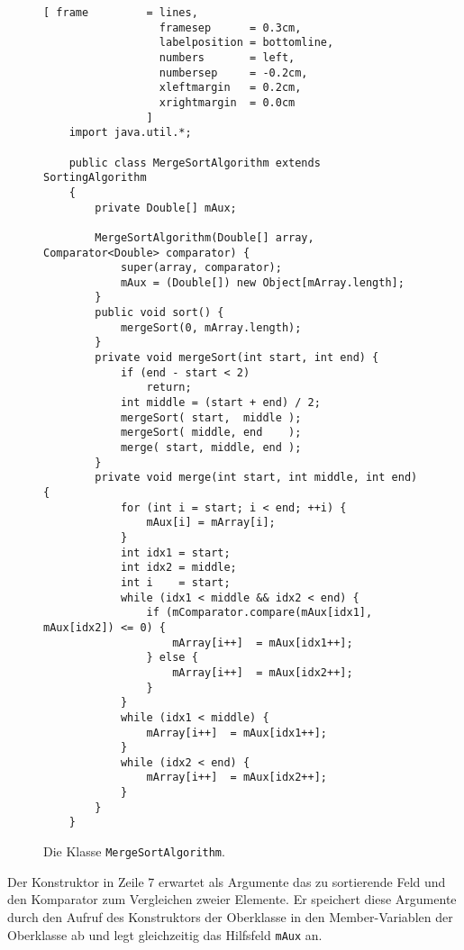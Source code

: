 \begin{figure}[!ht]
  \centering
\begin{Verbatim}[ frame         = lines, 
                  framesep      = 0.3cm, 
                  labelposition = bottomline,
                  numbers       = left,
                  numbersep     = -0.2cm,
                  xleftmargin   = 0.2cm,
                  xrightmargin  = 0.0cm
                ]
    import java.util.*;
    
    public class MergeSortAlgorithm extends SortingAlgorithm
    {
        private Double[] mAux;        
        
        MergeSortAlgorithm(Double[] array, Comparator<Double> comparator) {
            super(array, comparator);
            mAux = (Double[]) new Object[mArray.length];
        }
        public void sort() {
            mergeSort(0, mArray.length);        
        }
        private void mergeSort(int start, int end) {
            if (end - start < 2)
                return;
            int middle = (start + end) / 2;                         
            mergeSort( start,  middle );  
            mergeSort( middle, end    );    
            merge( start, middle, end ); 
        }
        private void merge(int start, int middle, int end) {    
            for (int i = start; i < end; ++i) {
                mAux[i] = mArray[i]; 
            }
            int idx1 = start;
            int idx2 = middle;
            int i    = start;
            while (idx1 < middle && idx2 < end) {
                if (mComparator.compare(mAux[idx1], mAux[idx2]) <= 0) {
                    mArray[i++]  = mAux[idx1++]; 
                } else {
                    mArray[i++]  = mAux[idx2++]; 
                }
            }
            while (idx1 < middle) {
                mArray[i++]  = mAux[idx1++];
            }
            while (idx2 < end) {
                mArray[i++]  = mAux[idx2++];  
            }
        }
    }
\end{Verbatim}
\vspace*{-0.3cm}
  \caption{Die Klasse \texttt{MergeSortAlgorithm}.}
  \label{fig:MergeSortAlgorithm.java}
\end{figure}
Der Konstruktor in Zeile 7 erwartet als Argumente das zu sortierende Feld und den
Komparator zum Vergleichen zweier Elemente.  Er speichert diese Argumente 
durch den Aufruf des Konstruktors der Oberklasse in den
Member-Variablen der Oberklasse ab und legt gleichzeitig das Hilfsfeld \texttt{mAux} an.

